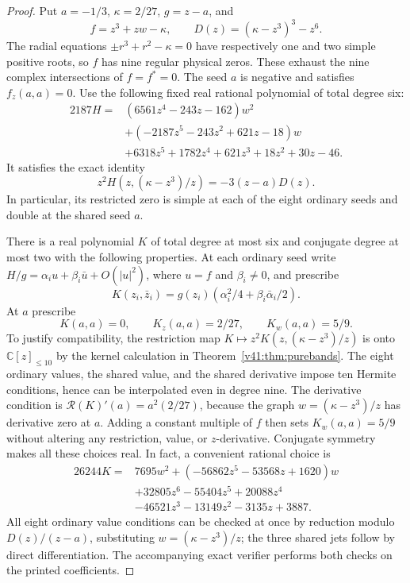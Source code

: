 \documentclass[UTF8,11pt]{ctexart}
\theoremstyle{definition}
\numberwithin{equation}{section}
\begin{document}
\begin{proof}
Put $a=-1/3$, $\kappa=2/27$, $g=z-a$, and
\[
 f=z^3+zw-\kappa,\qquad
 D(z)=(\kappa-z^3)^3-z^6.
\]
The radial equations $\pm r^3+r^2-\kappa=0$ have respectively
one and two simple positive roots, so $f$ has nine regular
physical zeros. These exhaust the nine complex intersections
of $f=f^*=0$. The seed $a$ is negative and satisfies $f_z(a,a)=0$.
Use the following fixed real rational polynomial of total degree six:
\begin{equation}\label{v43:eq:H}
\begin{split}
2187H={}&(6561z^4-243z-162)w^2\\
       &+(-2187z^5-243z^2+621z-18)w\\
       &+6318z^5+1782z^4+621z^3+18z^2+30z-46.
\end{split}
\end{equation}
It satisfies the exact identity
\[
                  z^2H(z,(\kappa-z^3)/z)=-3(z-a)D(z).
\]
In particular, its restricted zero is simple at each of the
eight ordinary seeds and double at the shared seed $a$.

There is a real polynomial $K$ of total degree at most six
and conjugate degree at most two with the following properties.
At each ordinary seed write $H/g=\alpha_i u+\beta_i\bar u+O(|u|^2)$,
where $u=f$ and $\beta_i\ne0$, and prescribe
\[
 K(z_i,\bar z_i)=g(z_i)
       (\alpha_i^2/4+\beta_i\bar\alpha_i/2).
\]
At $a$ prescribe
\begin{equation}\label{v43:eq:Kjet}
                 K(a,a)=0,\qquad K_z(a,a)=2/27,\qquad K_w(a,a)=5/9.
\end{equation}
To justify compatibility, the restriction map
$K\mapsto z^2K(z,(\kappa-z^3)/z)$ is onto
$\mathbb C[z]_{\le10}$ by the kernel calculation in
Theorem~\ref{v41:thm:purebands}. The eight ordinary values,
the shared value, and the shared derivative impose ten Hermite
conditions, hence can be interpolated even in degree nine.
The derivative condition is $\mathcal R(K)'(a)=a^2(2/27)$,
because the graph $w=(\kappa-z^3)/z$ has derivative zero at $a$.
Adding a constant multiple of $f$ then sets $K_w(a,a)=5/9$
without altering any restriction, value, or $z$-derivative.
Conjugate symmetry makes all these choices real.
In fact, a convenient rational choice is
\begin{equation}\label{v43:eq:explicitK}
\begin{split}
26244K={}&7695w^2+(-56862z^5-53568z+1620)w\\
        &+32805z^6-55404z^5+20088z^4\\
        &-46521z^3-13149z^2-3135z+3887.
\end{split}
\end{equation}
All eight ordinary value conditions can be checked at once
by reduction modulo $D(z)/(z-a)$, substituting
$w=(\kappa-z^3)/z$; the three shared jets follow by direct
differentiation. The accompanying exact verifier performs
both checks on the printed coefficients.


\end{proof}
\end{document}
